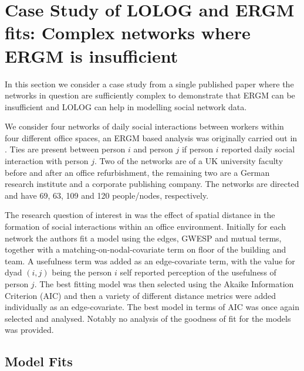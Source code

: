 \documentclass[
]{statsoc}
\begin{document}
\section{Case Study of LOLOG and ERGM fits: Complex networks where ERGM is insufficient}\label{sec:offices}

In this section we consider a case study from a single published paper
where the networks in question are sufficiently complex to demonstrate
that ERGM can be insufficient and LOLOG can help in modelling social
network data.

We consider four networks of daily social interactions between workers
within four different office spaces, an ERGM based analysis was
originally carried out in \cite{Sailer2012}. Ties are present between
person \(i\) and person \(j\) if person \(i\) reported daily social
interaction with person \(j\). Two of the networks are of a UK
university faculty before and after an office refurbishment, the
remaining two are a German research institute and a corporate publishing
company. The networks are directed and have 69, 63, 109 and 120
people/nodes, respectively.

The research question of interest in \cite{Sailer2012} was the effect of
spatial distance in the formation of social interactions within an
office environment. Initially for each network the authors fit a model
using the edges, GWESP and mutual terms, together with a
matching-on-nodal-covariate term on floor of the building and team. A
usefulness term was added as an edge-covariate term, with the value for
dyad \((i,j)\) being the person \(i\) self reported perception of the
usefulness of person \(j\). The best fitting model was then selected
using the Akaike Information Criterion (AIC) and then a variety of
different distance metrics were added individually as an edge-covariate.
The best model in terms of AIC was once again selected and analysed.
Notably no analysis of the goodness of fit for the models was provided.

\subsection{Model Fits}
\end{document}
